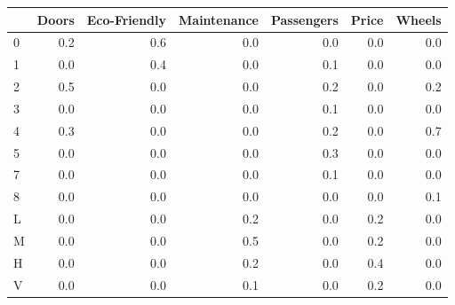 \begin{tabular}{lrrrrrr}
\toprule
{} &  Doors &  Eco-Friendly &  Maintenance &  Passengers &  Price &  Wheels \\
\midrule
0 &    0.2 &           0.6 &          0.0 &         0.0 &    0.0 &     0.0 \\
1 &    0.0 &           0.4 &          0.0 &         0.1 &    0.0 &     0.0 \\
2 &    0.5 &           0.0 &          0.0 &         0.2 &    0.0 &     0.2 \\
3 &    0.0 &           0.0 &          0.0 &         0.1 &    0.0 &     0.0 \\
4 &    0.3 &           0.0 &          0.0 &         0.2 &    0.0 &     0.7 \\
5 &    0.0 &           0.0 &          0.0 &         0.3 &    0.0 &     0.0 \\
7 &    0.0 &           0.0 &          0.0 &         0.1 &    0.0 &     0.0 \\
8 &    0.0 &           0.0 &          0.0 &         0.0 &    0.0 &     0.1 \\
L &    0.0 &           0.0 &          0.2 &         0.0 &    0.2 &     0.0 \\
M &    0.0 &           0.0 &          0.5 &         0.0 &    0.2 &     0.0 \\
H &    0.0 &           0.0 &          0.2 &         0.0 &    0.4 &     0.0 \\
V &    0.0 &           0.0 &          0.1 &         0.0 &    0.2 &     0.0 \\
\bottomrule
\end{tabular}
